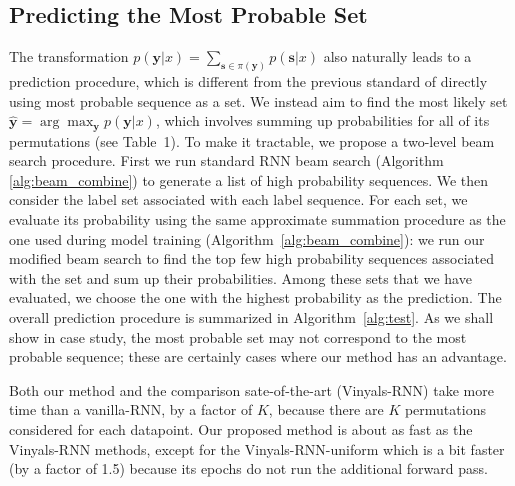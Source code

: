 \subsection{Predicting the Most Probable Set}
The transformation $p(\mathbf{y}|x)=\sum_{\mathbf{s}\in \pi(\mathbf{y})} p(\mathbf{s}|x)$ also naturally leads to a prediction procedure, which is different from the previous standard of directly using most probable sequence as a set. We instead aim to find the most likely set $\hat{\mathbf{y}}=\arg\max_{\mathbf{y}} p(\mathbf{y}|x)$, which involves summing up probabilities for all of its permutations (see Table~1). To make it tractable, we propose a two-level beam search procedure. First we run standard RNN beam search (Algorithm \ref{alg:beam_combine}) to generate a list of high probability sequences.  We then consider the label set associated with each label sequence.  For each set, we evaluate its probability using the same approximate summation procedure as the one used during model training (Algorithm~\ref{alg:beam_combine}): we run our modified beam search to find the top few high probability sequences associated with the set and sum up their probabilities. Among these sets that we have evaluated, we choose the one with the highest probability as the prediction. The overall prediction procedure is summarized in Algorithm~\ref{alg:test}. As we shall show in case study, the most probable set may not correspond to the most probable sequence; these are certainly cases where our method has an advantage.


Both our method and the comparison sate-of-the-art (Vinyals-RNN) take more time than a vanilla-RNN, by a factor of $K$, because there are $K$ permutations considered for each datapoint. Our proposed method is about as fast as the Vinyals-RNN methods, except for the Vinyals-RNN-uniform which is a bit faster (by a factor of 1.5) because its epochs do not run the additional forward pass. 

